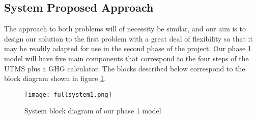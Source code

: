 \documentclass[12pt]{article}
\begin{document}
\subsection{System Proposed Approach}
The approach to both problems will of necessity be similar, and our
aim is to design our solution to the first problem with a great deal
of flexibility so that it may be readily adapted for use in the second
phase of the project. Our phase 1 model will have five main components
that correspond to the four steps of the UTMS plus a GHG
calculator. The blocks described below correspond to the block diagram
shown in figure \ref{mainsystem1}.

\begin{figure}[htp]
  \centering
  \texttt{[image: fullsystem1.png]}
  \caption{System block diagram of our phase 1 model}
  \label{mainsystem1}
\end{figure}
\end{document}
